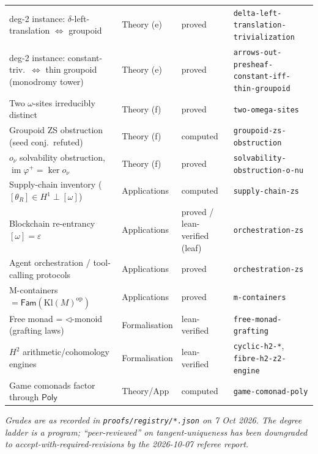 \documentclass[11pt]{article}
\newcommand{\Poly}{\mathsf{Poly}}
\newcommand{\Fam}{\mathsf{Fam}}
\newcommand{\reg}[1]{\texttt{#1}}
\begin{document}
\begin{longtable}{p{6.6cm} p{2.0cm} p{2.4cm} p{3.6cm}}
\quad deg-2 instance: $\delta$-left-translation $\Leftrightarrow$ groupoid & Theory (e) & proved & \reg{delta-left-translation-trivialization} \\
\quad deg-2 instance: constant-triv.\ $\Leftrightarrow$ thin groupoid (monodromy tower) & Theory (e) & proved & \reg{arrows-out-presheaf-constant-iff-thin-groupoid} \\
Two $\omega$-sites irreducibly distinct & Theory (f) & proved & \reg{two-omega-sites} \\
Groupoid ZS obstruction (seed conj.\ refuted) & Theory (f) & computed & \reg{groupoid-zs-obstruction} \\
$o_\nu$ solvability obstruction, $\operatorname{im}\varphi^+=\ker o_\nu$ & Theory (f) & proved & \reg{solvability-obstruction-o-nu} \\
Supply-chain inventory ($[\theta_R]\in H^1\perp[\omega]$) & Applications & computed & \reg{supply-chain-zs} \\
Blockchain re-entrancy $[\omega]=\varepsilon$ & Applications & proved / lean-verified (leaf) & \reg{orchestration-zs} \\
Agent orchestration / tool-calling protocols & Applications & proved & \reg{orchestration-zs} \\
M-containers $=\Fam(\mathrm{Kl}(M)^{\mathrm{op}})$ & Applications & proved & \reg{m-containers} \\
Free monad = $\lhd$-monoid (grafting laws) & Formalisation & lean-verified & \reg{free-monad-grafting} \\
$H^2$ arithmetic/cohomology engines & Formalisation & lean-verified & \reg{cyclic-h2-*}, \reg{fibre-h2-z2-engine} \\
Game comonads factor through $\Poly$ & Theory/App & computed & \reg{game-comonad-poly} \\
\end{longtable}
\endgroup

\begin{center}\small
\emph{Grades are as recorded in \reg{proofs/registry/*.json} on 7 Oct 2026. The degree
ladder is a program; ``peer-reviewed'' on tangent-uniqueness has been downgraded to
accept-with-required-revisions by the 2026-10-07 referee report.}
\end{center}
\end{document}

